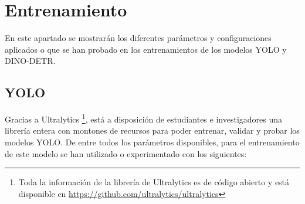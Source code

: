 \documentclass[12pt,a4paper,onecolumn,oneside]{report}
\begin{document}
\section{Entrenamiento}

En este apartado se mostrarán los diferentes parámetros y configuraciones aplicados o que se han probado en los entrenamientos de los modelos YOLO y DINO-DETR.

\subsection{YOLO}

Gracias a Ultralytics \footnote{Toda la información de la librería de Ultralytics es de código abierto y está disponible en \url{https://github.com/ultralytics/ultralytics}}, está a disposición de estudiantes e investigadores una librería entera con montones de recursos para poder entrenar, validar y probar los modelos YOLO. De entre todos los parámetros disponibles, para el entrenamiento de este modelo se han utilizado o experimentado con los siguientes:
\end{document}
